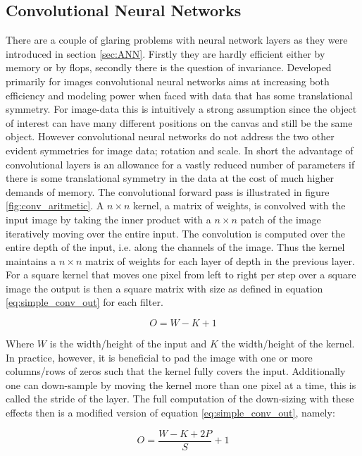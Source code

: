 \subsection{Convolutional Neural Networks}\label{sec:cnn}

There are a couple of glaring problems with neural network layers as they were introduced in section \ref{sec:ANN}. Firstly they are hardly efficient either by memory or by flops, secondly there is the question of invariance. Developed primarily for images convolutional neural networks aims at increasing both efficiency and modeling power when faced with data that has some translational symmetry. For image-data this is intuitively a strong assumption since the object of interest can have many different positions on the canvas and still be the same object. However convolutional neural networks do not address the two other evident symmetries for image data; rotation and scale. In short the advantage of convolutional layers is an allowance for a vastly reduced number of parameters if there is some translational symmetry in the data at the cost of much higher demands of memory. The convolutional forward pass is illustrated in figure \ref{fig:conv_aritmetic}. A $n\times n$ kernel, a matrix of weights, is convolved with the input image by taking the inner product with a $n\times n$ patch of the image iteratively moving over the entire input. The convolution is computed over the entire depth of the input, i.e. along the channels of the image. Thus the kernel maintains a $n\times n$ matrix of weights for each layer of depth in the previous layer. For a square kernel that moves one pixel from left to right per step over a square image the output is then a square matrix with size as defined in equation \ref{eq:simple_conv_out} for each filter. 

\begin{equation}\label{eq:simple_conv_out}
O = W - K +1
\end{equation}

\noindent Where $W$ is the width/height of the input and $K$ the width/height of the kernel. In practice, however, it is beneficial to pad the image with one or more columns/rows of zeros such that the kernel fully covers the input. Additionally one can down-sample by moving the kernel more than one pixel at a time, this is called the stride of the layer. The full computation of the down-sizing with these effects then is a modified version of equation \ref{eq:simple_conv_out}, namely: 

\begin{equation}\label{eq:conv_out}
O = \frac{W - K + 2P}{S} + 1
\end{equation} 

